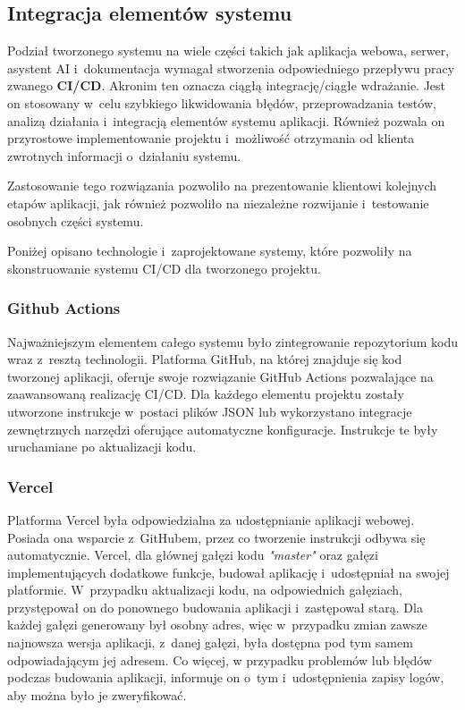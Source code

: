 \subsection{Integracja elementów systemu}

Podział tworzonego systemu na wiele części
takich jak aplikacja webowa, serwer, asystent AI
i~dokumentacja wymagał stworzenia odpowiedniego
przepływu pracy zwanego \textbf{CI/CD}. Akronim ten oznacza
ciągłą integrację/ciągłe wdrażanie. Jest on stosowany
w~celu szybkiego likwidowania błędów, przeprowadzania
testów, analizą działania i~integracją elementów systemu
aplikacji. Również pozwala on przyrostowe implementowanie
projektu i~możliwość otrzymania od klienta zwrotnych
informacji o~działaniu systemu.

Zastosowanie tego rozwiązania pozwoliło na
prezentowanie klientowi kolejnych etapów aplikacji, jak
również pozwoliło na niezależne rozwijanie
i~testowanie osobnych części systemu.

Poniżej opisano technologie i~zaprojektowane systemy,
które pozwoliły na skonstruowanie systemu CI/CD dla
tworzonego projektu.


\subsubsection{Github Actions}

Najważniejszym elementem całego systemu było zintegrowanie
repozytorium kodu
wraz z~resztą technologii. Platforma GitHub, na której
znajduje się kod tworzonej aplikacji, oferuje swoje
rozwiązanie GitHub Actions\cite{GithubActions} pozwalające
na zaawansowaną realizację CI/CD. Dla każdego elementu
projektu zostały utworzone instrukcje w~postaci plików JSON
lub wykorzystano integracje zewnętrznych narzędzi oferujące
automatyczne konfiguracje. Instrukcje te były uruchamiane
po aktualizacji kodu.


\subsubsection{Vercel}

Platforma Vercel\cite{Vercel} była odpowiedzialna za
udostępnianie aplikacji webowej. Posiada ona wsparcie \mbox{z~GitHubem},
przez co tworzenie instrukcji odbywa się automatycznie.
Vercel, dla głównej gałęzi kodu \textit{"master"} oraz
gałęzi implementujących dodatkowe funkcje, budował aplikację
i~udostępniał na swojej platformie. W~przypadku aktualizacji
kodu, na odpowiednich gałęziach, przystępował on do ponownego
budowania aplikacji i~zastępował starą. Dla każdej gałęzi
generowany był osobny adres, więc w~przypadku zmian zawsze
najnowsza wersja aplikacji, z~danej gałęzi, była dostępna pod
tym samem odpowiadającym jej adresem. Co więcej, w przypadku
problemów lub błędów podczas budowania aplikacji, informuje
on o~tym i~udostępnienia zapisy logów, aby można było je
zweryfikować.

